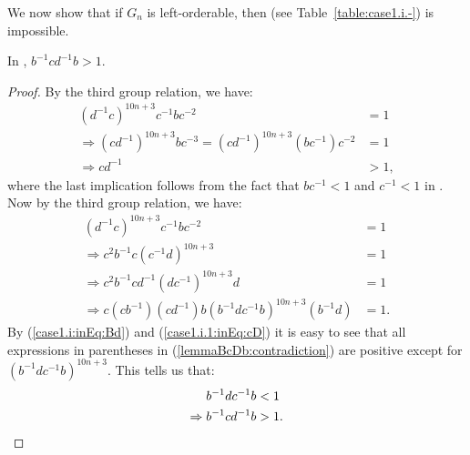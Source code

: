 
\subsubsection{\protect{}}

\noindent{}We now show that if $G_n$ is left-orderable, then  (see Table~\ref{table:case1.i.-}) is impossible.

\begin{lemma} In , $b^{-1}cd^{-1}b>1$.\label{case1.i.1:inEq:BcDb}
\end{lemma}
\begin{proof} By the third group relation, we have:
\begin{align}
(d^{-1}c)^{10n+3}c^{-1}bc^{-2}&=1\nonumber{}\\
\Rightarrow{}(cd^{-1})^{10n+3}bc^{-3}=(cd^{-1})^{10n+3}(bc^{-1})c^{-2}&=1\nonumber{}\\
\Rightarrow{}cd^{-1}&>1,\label{case1.i.1:inEq:cD}
\end{align}
where the last implication follows from the fact that $bc^{-1}<1$ and $c^{-1}<1$ in . Now by the third group relation, we have:
\begin{align}
(d^{-1}c)^{10n+3}c^{-1}bc^{-2}&=1\nonumber{}\\
\Rightarrow{}c^{2}b^{-1}c(c^{-1}d)^{10n+3}&=1\nonumber{}\\
\Rightarrow{}c^{2}b^{-1}cd^{-1}(dc^{-1})^{10n+3}d&=1\nonumber{}\\
\Rightarrow{}c(cb^{-1})(cd^{-1})b(b^{-1}dc^{-1}b)^{10n+3}(b^{-1}d)&=1.\label{lemmaBcDb:contradiction}
\end{align}
By (\ref{case1.i:inEq:Bd}) and (\ref{case1.i.1:inEq:cD}) it is easy to see that all expressions in parentheses in (\ref{lemmaBcDb:contradiction}) are positive except for $(b^{-1}dc^{-1}b)^{10n+3}$. This tells us that:
\begin{align*}
b^{-1}dc^{-1}b&<1\\
\Rightarrow{}b^{-1}cd^{-1}b&>1.\qedhere
\end{align*}
\end{proof}


